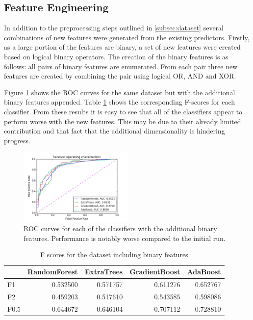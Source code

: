\documentclass[journal]{IEEEtran}
\begin{document}
\subsection{Feature Engineering}
In addition to the preprocessing steps outlined in \ref{subsec:dataset} several combinations of new features were generated from the existing predictors. Firstly, as a large portion of the features are binary, a set of new features were created based on logical binary operators. The creation of the binary features is as follows: all pairs of binary features are enumerated. From each pair three new features are created by combining the pair using logical OR, AND and XOR.

Figure \ref{fig:roc-binary-features} shows the ROC curves for the same dataset but with the additional binary features appended. Table \ref{table:f-scores-binary} shows the corresponding F-scores for each classifier. From these results it is easy to see that all of the classifiers appear to perform worse with the new features. This may be due to their already limited contribution and that fact that the additional dimensionality is hindering progress.

\begin{figure}[!t]
\centering
\includegraphics[width=0.5\textwidth]{../src/img/roc_binary_features.png}
\caption{ROC curves for each of the classifiers with the additional binary features. Performance is notably worse compared to the initial run.}
\label{fig:roc-binary-features}
\end{figure}


\begin{table}
\caption{F scores for the dataset including binary features}
\begin{tabular}{lrrrr}
{} &  RandomForest &  ExtraTrees &  GradientBoost &  AdaBoost \\
\hline
F1   &      0.532500 &    0.571757 &       0.611276 &  0.652767 \\
F2   &      0.459203 &    0.517610 &       0.543585 &  0.598086 \\
F0.5 &      0.644672 &    0.646104 &       0.707112 &  0.728810 \\
\end{tabular}
\label{table:f-scores-binary}	
\end{table}
\end{document}
